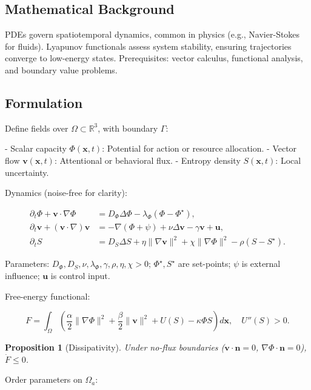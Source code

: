 \documentclass[11pt]{article}
\theoremstyle{plain}
\newtheorem{proposition}{Proposition}
\begin{document}
\subsection{Mathematical Background}
PDEs govern spatiotemporal dynamics, common in physics (e.g., Navier-Stokes for fluids). Lyapunov functionals assess system stability, ensuring trajectories converge to low-energy states. Prerequisites: vector calculus, functional analysis, and boundary value problems.

\subsection{Formulation}
Define fields over \(\Omega \subset \mathbb{R}^3\), with boundary \(\Gamma\):

- Scalar capacity \(\Phi(\mathbf{x}, t)\): Potential for action or resource allocation.
- Vector flow \(\mathbf{v}(\mathbf{x}, t)\): Attentional or behavioral flux.
- Entropy density \(S(\mathbf{x}, t)\): Local uncertainty.

Dynamics (noise-free for clarity):

\begin{align}
\partial_t \Phi + \mathbf{v} \cdot \nabla \Phi &= D_\Phi \Delta \Phi - \lambda_\Phi (\Phi - \Phi^\star), \label{eq:phi} \\
\partial_t \mathbf{v} + (\mathbf{v} \cdot \nabla) \mathbf{v} &= -\nabla (\Phi + \psi) + \nu \Delta \mathbf{v} - \gamma \mathbf{v} + \mathbf{u}, \label{eq:v} \\
\partial_t S &= D_S \Delta S + \eta \|\nabla \mathbf{v}\|^2 + \chi \|\nabla \Phi\|^2 - \rho (S - S^\star). \label{eq:s}
\end{align}

Parameters: \(D_\Phi, D_S, \nu, \lambda_\Phi, \gamma, \rho, \eta, \chi > 0\); \(\Phi^\star, S^\star\) are set-points; \(\psi\) is external influence; \(\mathbf{u}\) is control input.

Free-energy functional:

\[
F = \int_\Omega \left( \frac{\alpha}{2} \|\nabla \Phi\|^2 + \frac{\beta}{2} \|\mathbf{v}\|^2 + U(S) - \kappa \Phi S \right) d\mathbf{x}, \quad U''(S) > 0.
\]

\begin{proposition}[Dissipativity]
Under no-flux boundaries (\(\mathbf{v} \cdot \mathbf{n} = 0\), \(\nabla \Phi \cdot \mathbf{n} = 0\)), \(\dot{F} \leq 0\).
\end{proposition}

Order parameters on \(\Omega_a\):
\end{document}
